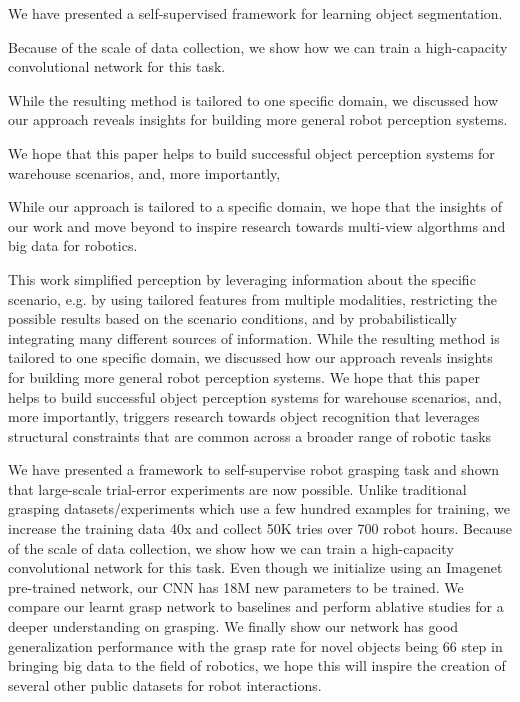 \documentclass[letterpaper, 10 pt, conference]{ieeeconf}  %
\begin{document}
We have presented a self-supervised framework for learning object segmentation.
 
  Because of the scale of
data collection, we show how we can train a high-capacity
convolutional network for this task.

 While the resulting method is tailored to
one specific domain, we discussed how our approach reveals
insights for building more general robot perception systems.

We hope that this paper helps to build successful object
perception systems for warehouse scenarios, and, more importantly,

While our approach is tailored to a specific domain, we hope that the insights of our work and move beyond to inspire research towards multi-view algorthms and big data for robotics.



 This work simplified perception
by leveraging information about the specific scenario,
e.g. by using tailored features from multiple modalities, restricting
the possible results based on the scenario conditions,
and by probabilistically integrating many different sources
of information. While the resulting method is tailored to
one specific domain, we discussed how our approach reveals
insights for building more general robot perception systems.
We hope that this paper helps to build successful object
perception systems for warehouse scenarios, and, more importantly,
triggers research towards object recognition that
leverages structural constraints that are common across a
broader range of robotic tasks

We have presented a framework to self-supervise robot
grasping task and shown that large-scale trial-error experiments
are now possible. Unlike traditional grasping
datasets/experiments which use a few hundred examples
for training, we increase the training data 40x and collect
50K tries over 700 robot hours. Because of the scale of
data collection, we show how we can train a high-capacity
convolutional network for this task. Even though we initialize
using an Imagenet pre-trained network, our CNN has 18M
new parameters to be trained. We compare our learnt grasp
network to baselines and perform ablative studies for a
deeper understanding on grasping. We finally show our
network has good generalization performance with the grasp
rate for novel objects being 66%
step in bringing big data to the field of robotics, we hope
this will inspire the creation of several other public datasets
for robot interactions.

\fi


{\footnotesize } 
\end{document}
